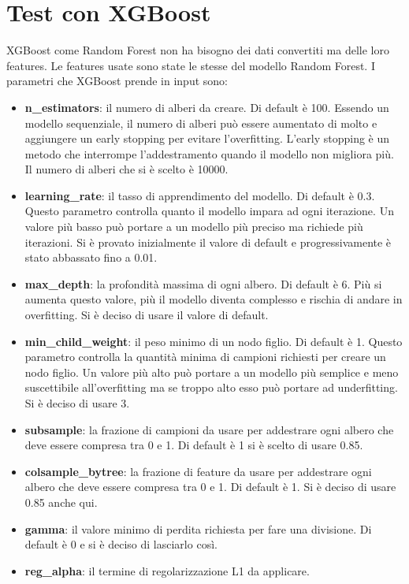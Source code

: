 \documentclass[12pt,a4paper,openright,twoside]{book}
\begin{document}
\section{Test con XGBoost}
XGBoost come Random Forest non ha bisogno dei dati convertiti
ma delle loro features.
Le features usate sono state le stesse del modello Random Forest.
I parametri che XGBoost prende in input sono:
\begin{itemize}
    \item \textbf{n\_estimators}: il numero di alberi da creare.
    Di default è 100. Essendo un modello sequenziale, il numero di alberi
    può essere aumentato di molto e aggiungere un early stopping
    per evitare l'overfitting. L'early stopping è un metodo che interrompe
    l'addestramento quando il modello non migliora più. Il numero
    di alberi che si è scelto è 10000.
    \item \textbf{learning\_rate}: il tasso di apprendimento del modello.
    Di default è 0.3. Questo parametro controlla quanto il modello
    impara ad ogni iterazione. Un valore più basso può portare a un modello
    più preciso ma richiede più iterazioni.
    Si è provato inizialmente il valore di default e progressivamente
    è stato abbassato fino a 0.01.
    \item \textbf{max\_depth}: la profondità massima di ogni albero.
    Di default è 6. Più si aumenta questo valore, più il modello
    diventa complesso e rischia di andare in overfitting.
    Si è deciso di usare il valore di default.
    \item \textbf{min\_child\_weight}: il peso minimo di un nodo figlio.
    Di default è 1. Questo parametro controlla la quantità minima
    di campioni richiesti per creare un nodo figlio. Un valore più alto
    può portare a un modello più semplice e meno suscettibile all'overfitting
    ma se troppo alto esso può portare ad underfitting.
    Si è deciso di usare 3.
    \item \textbf{subsample}: la frazione di campioni da usare per addestrare
    ogni albero che deve essere compresa tra 0 e 1. Di default è 1
    si è scelto di usare 0.85.
    \item \textbf{colsample\_bytree}: la frazione di feature da usare per addestrare
    ogni albero che deve essere compresa tra 0 e 1. Di default è 1.
    Si è deciso di usare 0.85 anche qui.
    \item \textbf{gamma}: il valore minimo di perdita richiesta per fare una divisione.
    Di default è 0 e si è deciso di lasciarlo così.
    \item \textbf{reg\_alpha}: il termine di regolarizzazione L1 da applicare.

\end{itemize}
\end{document}
